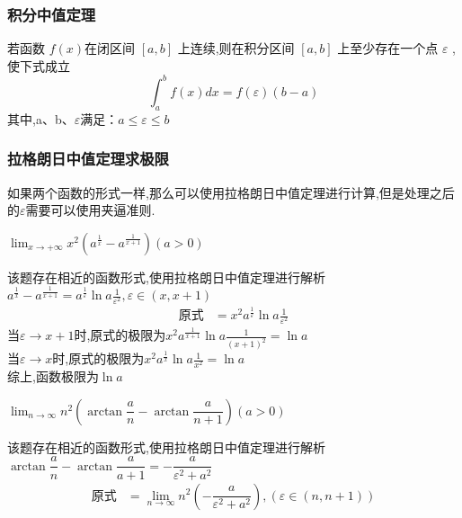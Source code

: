\documentclass[8pt a4paper, oneside, UTF8]{ctexbook}
\begin{document}
\begin{sloppypar}
    \subsubsection{积分中值定理}\label{jfzz1}
    \begin{defn}{}{}
        若函数 $f\left(x\right)$在闭区间 $[a,b]$ 上连续,则在积分区间 $[a,b]$ 上至少存在一个点 $\varepsilon$ , 使下式成立
            $$
                \int_a^bf\left(x\right)dx=f\left(\varepsilon\right)\left(b-a\right)
            $$
        其中,a、b、$\varepsilon$满足：$a\leq\varepsilon\leq b$
    \end{defn}
    \subsubsection{拉格朗日中值定理求极限}
    如果两个函数的形式一样,那么可以使用拉格朗日中值定理进行计算,但是处理之后的$\varepsilon$需要可以使用夹逼准则.
    \begin{problem}
    $\lim_{x\to+\infty}x^{2}\left(a^{\frac{1}{x}}-a^{\frac{1}{x+1}}\right)\left(a>0\right)$        
    \end{problem}
    \begin{solution}
        该题存在相近的函数形式,使用拉格朗日中值定理进行解析$a^{\frac{1}{x}}-a^{\frac{1}{x+1}}=a^{\frac{1}{\varepsilon}}\ln a\frac{1}{\varepsilon ^2},\varepsilon \in (x,x+1)$
        \begin{align*}
            \text{原式} & = x^2 a^{\frac{1}{\varepsilon}}\ln a\frac{1}{\varepsilon ^2} 
        \end{align*}
        当$\varepsilon \to x+1$时,原式的极限为$x^2 a^{\frac{1}{x+1}}\ln a \frac{1}{(x+1)^2}=\ln a$\\
        当$\varepsilon \to x$时,原式的极限为$x^2 a^{\frac{1}{x}}\ln a \frac{1}{x^2}=\ln a$\\
        综上,函数极限为$\ln a$
    \end{solution}
    \begin{problem}
        $\lim_{n\to\infty}n^{2}\left(\arctan\dfrac{a}{n}-\arctan\dfrac{a}{n+1}\right)\left(a>0\right)$
    \end{problem}
    \begin{solution}
        该题存在相近的函数形式,使用拉格朗日中值定理进行解析$\arctan \dfrac{a}{n}-\arctan \dfrac{a}{a+1}=-\dfrac{a}{ \varepsilon^2 +a^2}$
        \begin{align*}
            \text{原式} & =\lim_{n\to \infty} n^2(-\dfrac{a}{\varepsilon^2+a^2}),(\varepsilon \in (n,n+1) )
        \end{align*}

\end{solution}
\end{sloppypar}
\end{document}
